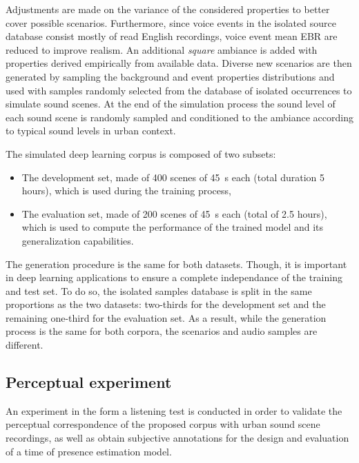 \documentclass[twocolumn]{article}
\begin{document}
Adjustments are made on the variance of the considered properties to better cover possible scenarios. Furthermore, since voice events in the isolated source database consist mostly of read English recordings, voice event mean EBR are reduced to improve realism. An additional \textit{square} ambiance is added with properties derived empirically from available data. Diverse new scenarios are then generated by sampling the background and event properties distributions and used with samples randomly selected from the database of isolated occurrences to simulate sound scenes. At the end of the simulation process the sound level of each sound scene is randomly sampled and conditioned to the ambiance according to typical sound levels in urban context.

The simulated deep learning corpus is composed of two subsets:
\begin{itemize}
\item The development set, made of 400 scenes of 45~s each (total duration 5 hours), which is used during the training process,
\item The evaluation set, made of 200 scenes of 45~s each (total of 2.5 hours), which is used to compute the performance of the trained model and its generalization capabilities.
\end{itemize}

The generation procedure is the same for both datasets. Though, it is important in deep learning applications to ensure a complete independance of the training and test set. To do so, the isolated samples database is split in the same proportions as the two datasets: two-thirds for the development set and the remaining one-third for the evaluation set. As a result, while the generation process is the same for both corpora, the scenarios and audio samples are different.

\subsection{Perceptual experiment}
\label{sec:data_exp}

An experiment in the form a listening test is conducted in order to validate the perceptual correspondence of the proposed corpus with urban sound scene recordings, as well as obtain subjective annotations for the design and evaluation of a time of presence estimation model.
\end{document}
